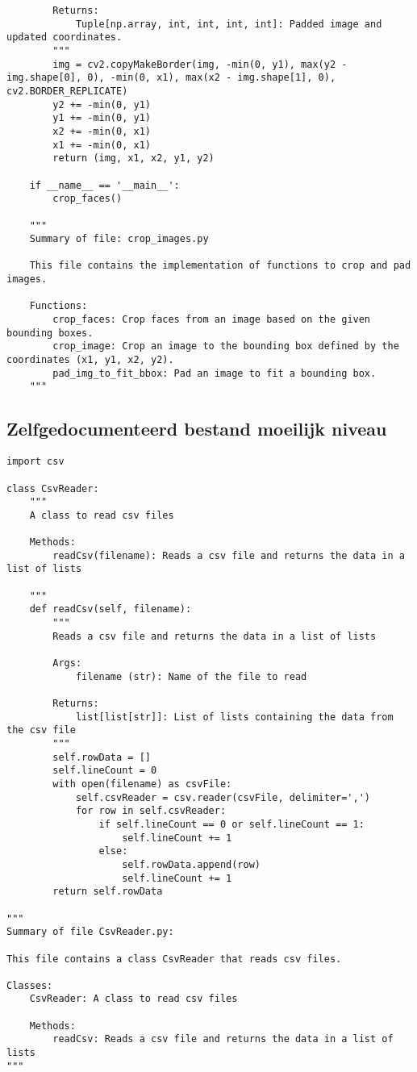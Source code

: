 \begin{verbatim}
        Returns:
            Tuple[np.array, int, int, int, int]: Padded image and updated coordinates.
        """
        img = cv2.copyMakeBorder(img, -min(0, y1), max(y2 - img.shape[0], 0), -min(0, x1), max(x2 - img.shape[1], 0), cv2.BORDER_REPLICATE)
        y2 += -min(0, y1)
        y1 += -min(0, y1)
        x2 += -min(0, x1)
        x1 += -min(0, x1)
        return (img, x1, x2, y1, y2)
    
    if __name__ == '__main__':
        crop_faces()
    
    """
    Summary of file: crop_images.py
    
    This file contains the implementation of functions to crop and pad images.
    
    Functions:
        crop_faces: Crop faces from an image based on the given bounding boxes.
        crop_image: Crop an image to the bounding box defined by the coordinates (x1, y1, x2, y2).
        pad_img_to_fit_bbox: Pad an image to fit a bounding box.
    """
\end{verbatim}

\subsection{Zelfgedocumenteerd bestand moeilijk niveau}
\label{bijlage:zelfgedocumenteerd-bestand-2}

\begin{verbatim}
import csv

class CsvReader:
    """
    A class to read csv files

    Methods:
        readCsv(filename): Reads a csv file and returns the data in a list of lists

    """
    def readCsv(self, filename):
        """
        Reads a csv file and returns the data in a list of lists
        
        Args: 
            filename (str): Name of the file to read
        
        Returns:
            list[list[str]]: List of lists containing the data from the csv file
        """
        self.rowData = []
        self.lineCount = 0
        with open(filename) as csvFile:
            self.csvReader = csv.reader(csvFile, delimiter=',')
            for row in self.csvReader:
                if self.lineCount == 0 or self.lineCount == 1:
                    self.lineCount += 1
                else:
                    self.rowData.append(row)
                    self.lineCount += 1
        return self.rowData
    
"""
Summary of file CsvReader.py:

This file contains a class CsvReader that reads csv files. 

Classes:
    CsvReader: A class to read csv files

    Methods:
        readCsv: Reads a csv file and returns the data in a list of lists
"""
\end{verbatim}


